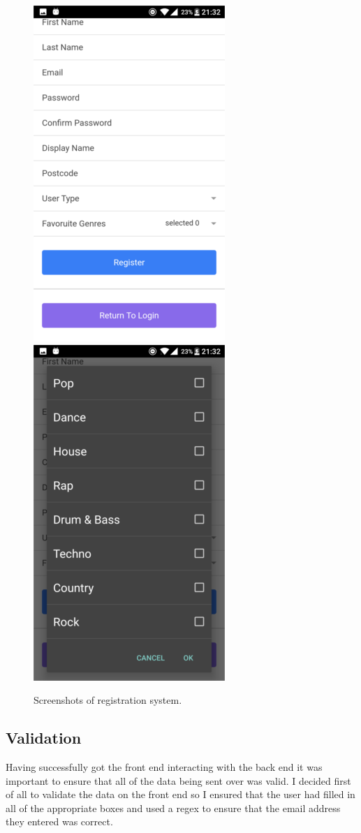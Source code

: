 \begin{figure}[H]
\includegraphics[scale=0.5]{images/sc3}
\includegraphics[scale=0.5]{images/sc4}
\caption{Screenshots of registration system.}
\end{figure}

\subsection{Validation}
Having successfully got the front end interacting with the back end it was important to ensure that all of the data being sent over was valid. I decided first of all to validate the data on the front end so I ensured that the user had filled in all of the appropriate boxes and used a regex to ensure that the email address they entered was correct.

